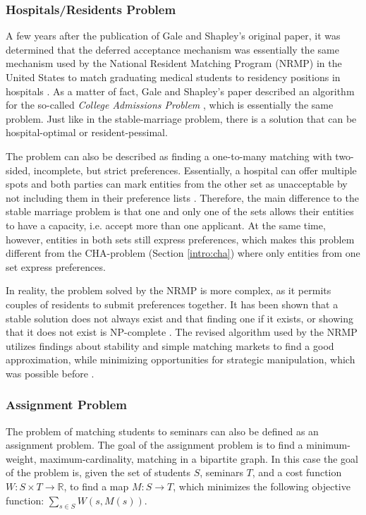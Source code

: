\subsubsection{Hospitals/Residents Problem}\label{intro:hospital-residents}
A few years after the publication of Gale and Shapley's original paper, it was determined that the deferred acceptance mechanism was essentially the same mechanism used by the National Resident Matching Program (NRMP) in the United States to match graduating medical students to residency positions in hospitals \cite{Gusfield}. As a matter of fact, Gale and Shapley's paper described an algorithm for the so-called \emph{College Admissions Problem} \cite{GaleShapleyOrig}, which is essentially the same problem. Just like in the stable-marriage problem, there is a solution that can be hospital-optimal or resident-pessimal. 

The problem can also be described as finding a one-to-many matching with two-sided, incomplete, but strict preferences. Essentially, a hospital can offer multiple spots and both parties can mark entities from the other set as unacceptable by not including them in their preference lists \cite{RePEc:ris:nobelp:2012_005}. Therefore, the main difference to the stable marriage problem is that one and only one of the sets allows their entities to have a capacity, i.e. accept more than one applicant. At the same time, however, entities in both sets still express preferences, which makes this problem different from the CHA-problem (Section \ref{intro:cha}) where only entities from one set express preferences.

In reality, the problem solved by the NRMP is more complex, as it permits couples of residents to submit preferences together. It has been shown that a stable solution does not always exist and that finding one if it exists, or showing that it does not exist is NP-complete \cite{RONN1990285}. The revised algorithm used by the NRMP utilizes findings about stability and simple matching markets to find a good approximation, while minimizing opportunities for strategic manipulation, which was possible before \cite{NBERw6963}.

\subsubsection{Assignment Problem}\label{intro_assignment}
The problem of matching students to seminars can also be defined as an assignment problem. The goal of the assignment problem is to find a minimum-weight, maximum-cardinality, matching in a bipartite graph. In this case the goal of the problem is, given the set of students $S$, seminars $T$, and a cost function $W: S \times T \rightarrow \mathbb{R}$, to find a map $M: S \rightarrow T$, which minimizes the following objective function:
$\sum_{s \in S} W(s, M(s))$.

